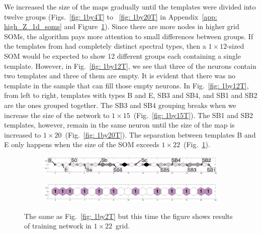             We increased the size of the maps gradually until the templates were divided into twelve groups (Figs.~\ref{fig: 1by4T} to ~\ref{fig: 1by20T} in Appendix~\ref{app: high_Z_1d_soms} and Figure~\ref{fig: 1by22T}).
            Since there are more nodes in higher grid SOMs, the algorithm 
            pays more attention to small differences between groups.
            If the templates from  had completely distinct spectral types, then a $1\times12$-sized SOM would be expected to show 12 different groups each containing a single template.
            However, in Fig.~\ref{fig: 1by12T}, we see that three of the neurons contain two templates and three of them are empty.
            It is evident that there was no template in the  sample that can fill those empty neurons.
            In Fig.~\ref{fig: 1by12T}, from left to right, templates with types B and E, SB3 and SB4, and SB1 and SB2 are the ones grouped together. 
            The SB3 and SB4 grouping breaks when we increase the size of the network to $1\times15$~(Fig.~\ref{fig: 1by15T}).
            The SB1 and SB2 templates, however, remain in the same neuron until the size of the map is increased to $1\times20$~(Fig.~\ref{fig: 1by20T}).
            The separation between templates B and E only happens when the size of the SOM exceeds $1\times22$~(Fig.~\ref{fig: 1by22T}).
            \begin{figure}
                \begin{subfigure}[b]{\textwidth}
                    \centering
                    \includegraphics[width=\textwidth]{images0.01/1d/dist_1_by_22.png}
                \end{subfigure}
                \hfill
                \begin{subfigure}[b]{\textwidth}
                    \includegraphics[width=\textwidth]{images0.01/1d/hit_t_1_by_22.png}
                \end{subfigure}
                \caption[Results of training network in $1\times22$~grid]{The same as Fig.~\ref{fig: 1by2T} but this time the figure shows results of training network in $1\times22$~grid.}
                \label{fig: 1by22T}
            \end{figure} 
    
